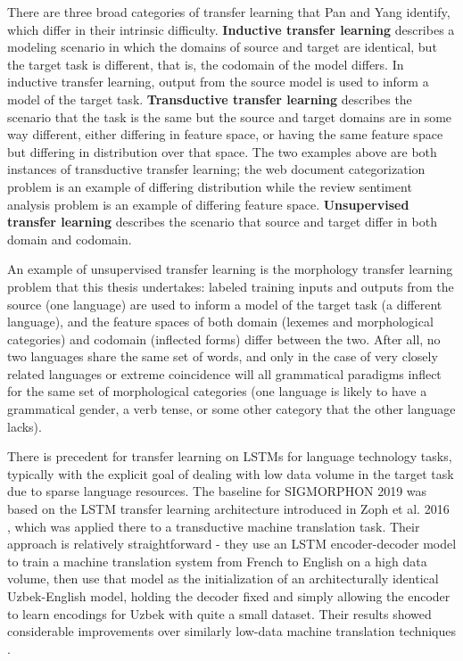 There are three broad categories of transfer learning that Pan and Yang identify, which differ in their intrinsic difficulty. \textbf{Inductive transfer learning} describes a modeling scenario in which the domains of source and target are identical, but the target task is different, that is, the codomain of the model differs. In inductive transfer learning, output from the source model is used to inform a model of the target task. \textbf{Transductive transfer learning} describes the scenario that the task is the same but the source and target domains are in some way different, either differing in feature space, or having the same feature space but differing in distribution over that space. The two examples above are both instances of transductive transfer learning; the web document categorization problem is an example of differing distribution while the review sentiment analysis problem is an example of differing feature space. \textbf{Unsupervised transfer learning} describes the scenario that source and target differ in both domain and codomain. 

An example of unsupervised transfer learning is the morphology transfer learning problem that this thesis undertakes: labeled training inputs and outputs from the source (one language) are used to inform a model of the target task (a different language), and the feature spaces of both domain (lexemes and morphological categories) and codomain (inflected forms) differ between the two. After all, no two languages share the same set of words, and only in the case of very closely related languages or extreme coincidence will all grammatical paradigms inflect for the same set of morphological categories (one language is likely to have a grammatical gender, a verb tense, or some other category that the other language lacks).

There is precedent for transfer learning on LSTMs for language technology tasks, typically with the explicit goal of dealing with low data volume in the target task due to sparse language resources. The baseline for SIGMORPHON 2019 was based on the LSTM transfer learning architecture introduced in Zoph et al. 2016 \parencite{McCarthy2019}, which was applied there to a transductive machine translation task. Their approach is relatively straightforward - they use an LSTM encoder-decoder model to train a machine translation system from French to English on a high data volume, then use that model as the initialization of an architecturally identical Uzbek-English model, holding the decoder fixed and simply allowing the encoder to learn encodings for Uzbek with quite a small dataset. Their results showed considerable improvements over similarly low-data machine translation techniques \parencite{Zoph2016}.

